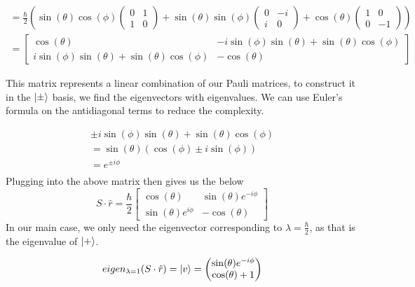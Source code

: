\documentclass[]{article}
\begin{document}
\[
\begin{align}
= \frac{\hbar}{2}\left( \sin(\theta) \cos(\phi) \begin{pmatrix}
0 & 1 \\
1 & 0
\end{pmatrix}
+ \sin(\theta) \sin(\phi) \begin{pmatrix}
0 & -i \\
i & 0
\end{pmatrix}
+ \cos(\theta) \begin{pmatrix}
1 & 0 \\
0 & -1
\end{pmatrix} \right)  \\ 
=\left[\begin{matrix}\cos{\left(\theta \right)} & - i \sin{\left(\phi \right)} \sin{\left(\theta \right)} + \sin{\left(\theta \right)} \cos{\left(\phi \right)}\\i \sin{\left(\phi \right)} \sin{\left(\theta \right)} + \sin{\left(\theta \right)} \cos{\left(\phi \right)} & - \cos{\left(\theta \right)}\end{matrix}\right]
\end{align}
\]

This matrix represents a linear combination of our Pauli matrices, to
construct it in the \(\ket{\pm}\) basis, we find the eigenvectors with
eigenvalues. We can use Euler's formula on the antidiagonal terms to
reduce the complexity.

\[
\begin{align}
\pm i\sin(\phi)\sin(\theta)+\sin(\theta)\cos(\phi) \\
=\sin(\theta)(\cos (\phi)\pm i\sin(\phi)) \\
= e^{ \pm i\phi }\\
\end{align}
\] Plugging into the above matrix then gives us the below \[
S\cdot \hat{r}=\frac{\hbar}{2}\begin{bmatrix}\cos{\left(\theta \right)} & \sin(\theta)e^{ -i\phi }\\\sin(\theta)e^{ i\phi } & - \cos{\left(\theta \right)}\end{bmatrix}
\] In our main case, we only need the eigenvector corresponding to
\(\lambda=\frac{\hbar}{2}\), as that is the eigenvalue of \(\ket{+}\).

\[
eigen_{\lambda=1}(S\cdot \hat{r}) =\ket{v} =\begin{pmatrix}
\sin (\theta) e^{ -i\phi } \\
\cos( \theta)+1
\end{pmatrix}
\]
\end{document}
